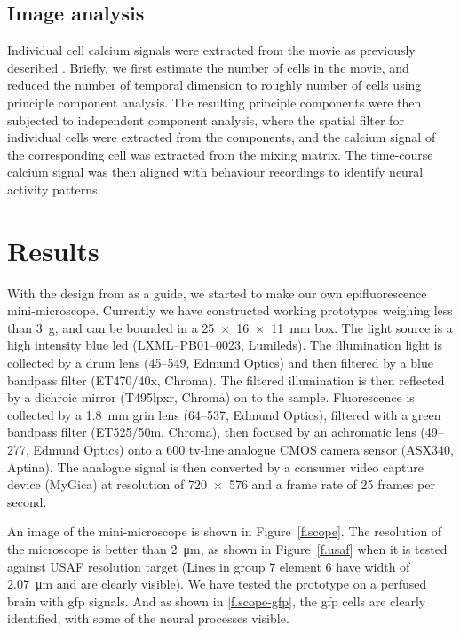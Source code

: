 \subsection{Image analysis}
Individual cell calcium signals were extracted from the movie as previously described \citep{mukamel09}. Briefly, we first estimate the number of cells in the movie, and reduced the number of temporal dimension to roughly number of cells using principle component analysis. The resulting principle components were then subjected to independent component analysis, where the spatial filter for individual cells were extracted from the components, and the calcium signal of the corresponding cell was extracted from the mixing matrix. The time-course calcium signal was then aligned with behaviour recordings to identify neural activity patterns.


\section{Results}

With the design from \citet{ghosh11} as a guide, we started to make our own epifluorescence mini-microscope. Currently we have constructed working prototypes weighing less than \SI{3}{\g}, and can be bounded in a \SI{25 x 16 x 11}{\mm} box. The light source is a high intensity blue \gls{led} (LXML--PB01--0023, Lumileds). The illumination light is collected by a drum lens (45--549, Edmund Optics) and then filtered by a blue bandpass filter (ET470/40x, Chroma). The filtered illumination is then reflected by a dichroic mirror (T495lpxr, Chroma) on to the sample. Fluorescence is collected by a \SI{1.8}{\mm} \gls{grin} lens (64--537, Edmund Optics), filtered with a green bandpass filter (ET525/50m, Chroma), then focused by an achromatic lens (49--277, Edmund Optics) onto a 600 tv-line analogue CMOS camera sensor (ASX340, Aptina). The analogue signal is then converted by a consumer video capture device (MyGica) at resolution of \num{720 x 576} and a frame rate of 25 frames per second.

An image of the mini-microscope is shown in Figure~\ref{f.scope}. The resolution of the microscope is better than \SI{2}{\um}, as shown in Figure~\ref{f.usaf} when it is tested against USAF resolution target (Lines in group 7 element 6 have width of \SI{2.07}{\um} and are clearly visible). We have tested the prototype on a perfused brain with \gls{gfp} signals. And as shown in \ref{f.scope-gfp}, the \gls{gfp} cells are clearly identified, with some of the neural processes visible.

